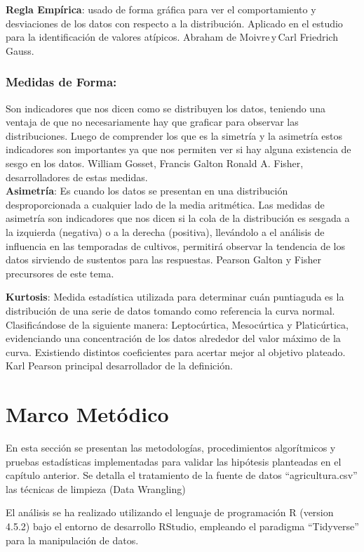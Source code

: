 \documentclass[oneside,11pt]{Latex/Classes/PhDthesisPSnPDF}
\begin{document}
\textbf{Regla Empírica}: usado de forma gráfica para ver el
comportamiento y desviaciones de los datos con respecto a la
distribución. Aplicado en el estudio para la identificación de valores
atípicos. Abraham de Moivre\,y\,Carl Friedrich Gauss.

\subsection{Medidas de Forma:}

Son indicadores que nos dicen como se distribuyen los datos, teniendo
una ventaja de que no necesariamente hay que graficar para observar las
distribuciones. Luego de comprender los que es la simetría y la
asimetría estos indicadores son importantes ya que nos permiten ver si
hay alguna existencia de sesgo en los datos. William Gosset, Francis
Galton Ronald A. Fisher, desarrolladores de estas medidas.\\

\textbf{Asimetría}: Es cuando los datos se presentan en una distribución
desproporcionada a cualquier lado de la media aritmética. Las medidas de
asimetría son indicadores que nos dicen si la cola de la distribución es
sesgada a la izquierda (negativa) o a la derecha (positiva), llevándolo
a el análisis de influencia en las temporadas de cultivos, permitirá
observar la tendencia de los datos sirviendo de sustentos para las
respuestas. Pearson Galton y Fisher precursores de este tema.

\textbf{Kurtosis}: Medida estadística utilizada para determinar cuán
puntiaguda es la distribución de una serie de datos tomando como
referencia la curva normal. Clasificándose de la siguiente manera:
Leptocúrtica, Mesocúrtica y Platicúrtica, evidenciando una concentración
de los datos alrededor del valor máximo de la curva. Existiendo
distintos coeficientes para acertar mejor al objetivo plateado. Karl
Pearson principal desarrollador de la definición.

\chapter{Marco Metódico}

En esta sección se presentan las metodologías, procedimientos
algorítmicos y pruebas estadísticas implementadas para validar las
hipótesis planteadas en el capítulo anterior. Se detalla el tratamiento
de la fuente de datos ``agricultura.csv'' las técnicas de limpieza (Data
Wrangling)

El análisis se ha realizado utilizando el lenguaje de programación R
(version 4.5.2) bajo el entorno de desarrollo RStudio, empleando el
paradigma ``Tidyverse'' para la manipulación de datos.
\end{document}
